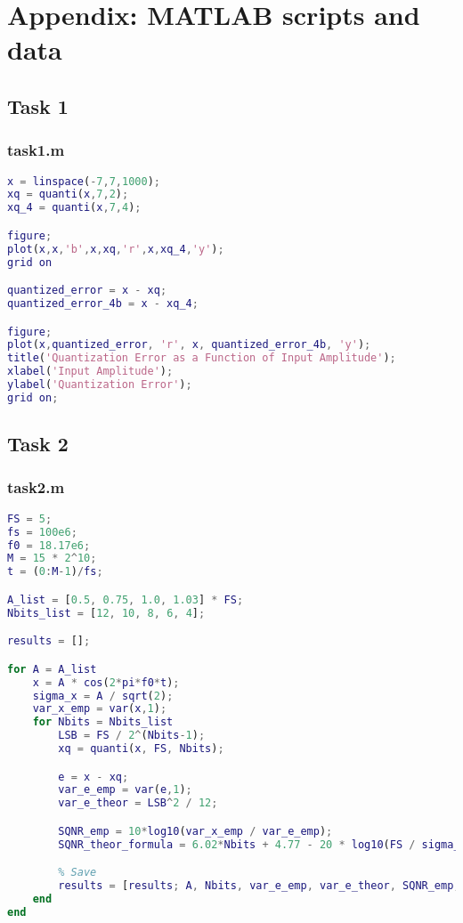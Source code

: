 \appendix
\section{Appendix: MATLAB scripts and data}
\label{app:matlab}

\subsection{Task 1}
\subsubsection{task1.m}

\begin{lstlisting}[language=Matlab]
x = linspace(-7,7,1000);
xq = quanti(x,7,2);
xq_4 = quanti(x,7,4);

figure;
plot(x,x,'b',x,xq,'r',x,xq_4,'y');
grid on

quantized_error = x - xq;
quantized_error_4b = x - xq_4;

figure;
plot(x,quantized_error, 'r', x, quantized_error_4b, 'y');
title('Quantization Error as a Function of Input Amplitude');
xlabel('Input Amplitude');
ylabel('Quantization Error');
grid on;
\end{lstlisting}

\subsection{Task 2}
\subsubsection{task2.m}

\begin{lstlisting}[language=Matlab]
FS = 5;
fs = 100e6;
f0 = 18.17e6;
M = 15 * 2^10;
t = (0:M-1)/fs;

A_list = [0.5, 0.75, 1.0, 1.03] * FS;
Nbits_list = [12, 10, 8, 6, 4];

results = [];

for A = A_list
    x = A * cos(2*pi*f0*t);
    sigma_x = A / sqrt(2);
    var_x_emp = var(x,1);
    for Nbits = Nbits_list
        LSB = FS / 2^(Nbits-1);
        xq = quanti(x, FS, Nbits);

        e = x - xq;
        var_e_emp = var(e,1);
        var_e_theor = LSB^2 / 12;

        SQNR_emp = 10*log10(var_x_emp / var_e_emp);
        SQNR_theor_formula = 6.02*Nbits + 4.77 - 20 * log10(FS / sigma_x);

        % Save
        results = [results; A, Nbits, var_e_emp, var_e_theor, SQNR_emp, SQNR_theor_formula];
    end
end
\end{lstlisting}


